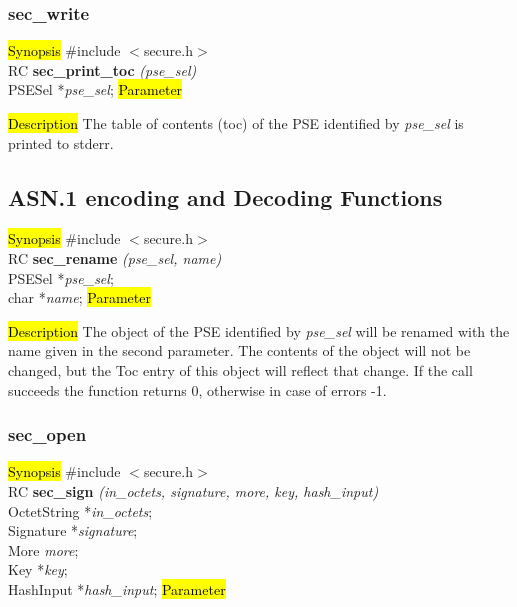 \subsubsection{sec\_write}
\label{sec_print_toc}
\hl{Synopsis}
\#include $<$secure.h$>$ \\ [0.5cm]
RC {\bf sec\_print\_toc} {\em (pse\_sel)} \\
PSESel *{\em pse\_sel};
\hl{Parameter}

\hl{Description}
The table of contents (toc) of the PSE identified by {\em pse\_sel} is printed to stderr.

\subsection{ASN.1 encoding and Decoding Functions}
\label{sec_rename}
\hl{Synopsis}
\#include $<$secure.h$>$ \\ [0.5cm]
RC {\bf sec\_rename} {\em (pse\_sel, name)} \\
PSESel *{\em pse\_sel}; \\
char  *{\em name};
\hl{Parameter}


\hl{Description}
The object of the PSE identified by {\em pse\_sel} will be renamed
with the name given in the second parameter. The contents of the
object will not be changed, but the Toc entry of this object
will reflect that change. If the call succeeds the function
returns 0, otherwise in case of errors -1.

\subsubsection{sec\_open}
\label{sec_sign}
\hl{Synopsis}
\#include $<$secure.h$>$ \\ [0.5cm]
RC {\bf sec\_sign} {\em (in\_octets, signature, more, key, hash\_input)} \\
OctetString *{\em in\_octets}; \\
Signature *{\em signature}; \\
More {\em more}; \\
Key *{\em key}; \\
HashInput *{\em hash\_input};
\hl{Parameter}

